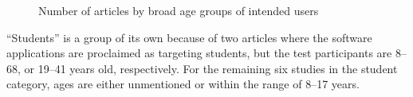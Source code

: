 \documentclass[utf8,english]{gradu3}
\begin{document}
\begin{figure}[thb]
  \centering
  \caption{Number of articles by broad age groups of intended users}
  \label{kuvaIät}
\end{figure}

``Students'' is a group of its own because of two articles where
the software applications are proclaimed as targeting students, but the test participants
are 8--68, or 19--41 years old, respectively. For the remaining six studies in the
student category, ages are either unmentioned or within the range of 8--17 years.

\end{document}
